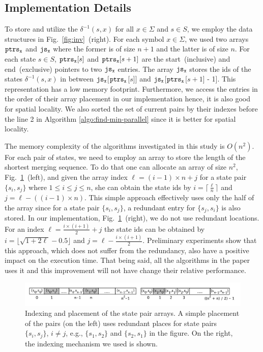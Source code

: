 \documentclass[12pt]{article}
\newcommand{\comment}[2]{{\color{red}{\bf (#1: #2)}}}
\begin{document}
\subsection{Implementation Details}\label{sec:implementation}
\comment{sertac}{kopyala yapistir oldu burasi}
To store and utilize the  $\delta^{-1}(s,x)$ for all $x \in \Sigma$ and $s \in S$, we employ the data structures in Fig.~\ref{fig:inv}~(right). For each symbol $x \in \Sigma$, we used two arrays ${\tt ptrs_x}$ and ${\tt js_x}$ where the former is of size $n + 1$ and the latter is of size $n$. For each state $s \in S$, ${\tt ptrs_x}[s]$ and ${\tt ptrs_x}[s+1]$ are the start~(inclusive) and end~(exclusive) pointers to two ${\tt js_x}$ entries.  The array ${\tt js_x}$ stores the ids of the states $\delta^{-1}(s,x)$ in between ${\tt js_x}$[{$\tt ptrs_x$}[$s$]]  and ${\tt js_x}$[{$\tt ptrs_x$}[$s+1$] - 1]. This representation has a low memory footprint. Furthermore, we access the entries in the order of their array placement  in our implementation hence, it is also good for spatial locality. We also sorted the set of current pairs by their indexes before the line 2 in Algorithm \ref{algo:find-min-parallel} since it is better for spatial locality.

The memory complexity of the algorithms investigated in this study is $O(n^2)$. For each pair of states, we need to employ an array to store the length of the shortest merging sequence. To do that one can allocate an array of size $n^2$, Fig.~\ref{fig:mem}~(left), and given the array index $\ell = (i-1) \times n + j$ for a state pair $\{s_i, s_j\}$ where $1  \leq i \leq j \leq n$, she can obtain the state ids by $i = \lceil{\frac{\ell}{n}} \rceil$  and $j =\ell - ((i -1) \times n)$. This simple approach effectively uses only the half of the array since for a state pair $\{s_i, s_j\}$, a redundant entry for $\{s_j, s_i\}$ is also stored. In our implementation, Fig.~\ref{fig:mem}~(right), we do not use redundant locations. For an index  $\ell = \frac{i \times (i+1)}{2} + j$ the state ids can be obtained by $i = \lfloor \sqrt{1 + 2\ell} - 0.5\rfloor$ and $j = \ell - \frac{i \times (i+1)}{2}$. Preliminary experiments show that this approach, which does not suffer from the redundancy,  also have a positive impact on the execution time. That being said, all the algorithms in the paper uses it and this improvement will not have change their relative performance.

\begin{figure}
	\centering
	\includegraphics[width=\textwidth]{figs/memory.pdf}
	\caption{Indexing and placement of the state pair arrays. A simple placement of the pairs (on the left) uses redundant places for state pairs $\{s_i, s_j\}$, $i \neq j$, e.g., $\{s_1, s_2\}$ and $\{s_2, s_1\}$ in the figure. On the right, the indexing mechanism we used is shown.}
	\label{fig:mem}
\end{figure}
\end{document}
